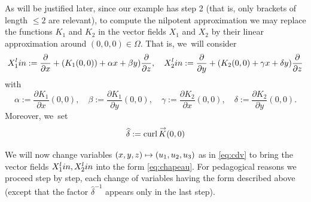 \documentclass[11pt]{article}
\newcommand\mto{\mathchoice{\longmapsto}{\mapsto}{\mapsto}{\mapsto}}
\newcommand{\lin}{\textup{lin}}
\DeclareMathOperator{\curl}{curl}
\renewcommand{\vec}[1]
{\overset{\,{\raisebox{-2pt}{$\scriptstyle\to$}}}{#1}}
\theoremstyle{definition}
\newcommand{\1}{\mathbbm{1}}
\numberwithin{equation}{section}
\begin{document}
As will be justified later, since our example has step 2 (that is, only brackets of length $\leq 2$ are relevant), to compute the nilpotent approximation we may replace the functions $K_1$ and $K_2$ in the vector fields $X_1$ and $X_2$ by their linear approximation around $(0,0,0)\in\Omega$. That is, we~will consider
\[
X_1^\lin := \frac{\partial}{\partial x} + (K_1(0,0)) + \alpha x + \beta y) \frac{\partial}{\partial z},\quad
X_2^\lin := \frac{\partial}{\partial y} +(K_2 (0,0) + \gamma x + \delta y) \frac{\partial}{\partial z}
\]
with
\[
\alpha := \frac{\partial K_1}{\partial x} (0,0),
\quad
\beta := \frac{\partial K_1}{\partial y} (0,0),
\quad
\gamma := \frac{\partial K_2}{\partial x} (0,0),
\quad
\delta := \frac{\partial K_2}{\partial y} (0,0).
\]
Moreover, we~set
\[
\widehat \delta := \curl \vec K (0,0)
\]

We will now change variables $(x,y,z)\mto (u_1,u_2,u_3)$ as in \eqref{eq:cdv} to bring the vector fields $X_1^\lin, X_2^\lin$ into the form \eqref{eq:chapeau}. For pedagogical reasons we proceed step by step, each change of variables having the form described above (except that the factor $\widehat\delta^{-1}$ appears only in the last step).
\end{document}
